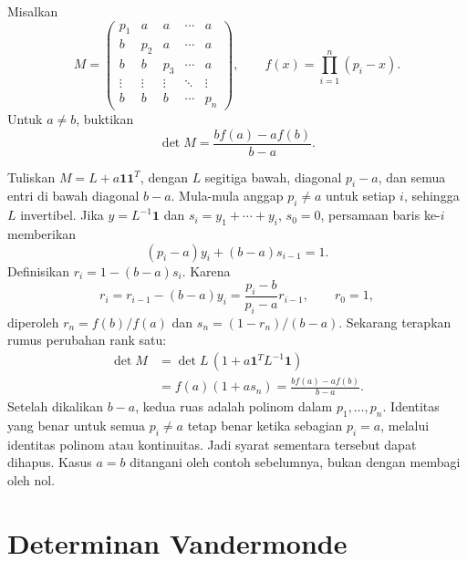 \begin{exam}
      \label{det:zhang26}
      Misalkan
      \[
            M=\begin{pmatrix}
                  p_1    & a      & a      & \cdots & a      \\
                  b      & p_2    & a      & \cdots & a      \\
                  b      & b      & p_3    & \cdots & a      \\
                  \vdots & \vdots & \vdots & \ddots & \vdots \\
                  b      & b      & b      & \cdots & p_n
            \end{pmatrix},\qquad f(x)=\prod_{i=1}^n(p_i-x).
      \]
      Untuk $a\ne b$, buktikan
      \[
            \det M=\frac{bf(a)-af(b)}{b-a}.
      \]
\end{exam}
\begin{solution}
      Tuliskan $M=L+a\boldsymbol{1}\boldsymbol{1}^T$, dengan $L$ segitiga
      bawah, diagonal $p_i-a$, dan semua entri di bawah diagonal $b-a$.
      Mula-mula anggap $p_i\ne a$ untuk setiap $i$, sehingga $L$ invertibel.
      Jika $y=L^{-1}\boldsymbol{1}$ dan $s_i=y_1+\cdots+y_i$, $s_0=0$,
      persamaan baris ke-$i$ memberikan
      \[
            (p_i-a)y_i+(b-a)s_{i-1}=1.
      \]
      Definisikan $r_i=1-(b-a)s_i$. Karena
      \[
            r_i=r_{i-1}-(b-a)y_i
            =\frac{p_i-b}{p_i-a}r_{i-1},\qquad r_0=1,
      \]
      diperoleh $r_n=f(b)/f(a)$ dan $s_n=(1-r_n)/(b-a)$.
      Sekarang terapkan rumus perubahan rank satu:
      \begin{align*}
            \det M
             & =\det L\,(1+a\boldsymbol{1}^TL^{-1}\boldsymbol{1}) \\
             & =f(a)(1+as_n)
            =\frac{bf(a)-af(b)}{b-a}.
      \end{align*}
      Setelah dikalikan $b-a$, kedua ruas adalah polinom dalam
      $p_1,\ldots,p_n$. Identitas yang benar untuk semua $p_i\ne a$
      tetap benar ketika sebagian $p_i=a$, melalui identitas polinom
      atau kontinuitas. Jadi syarat sementara tersebut dapat dihapus.
      Kasus $a=b$ ditangani oleh contoh sebelumnya, bukan dengan membagi oleh nol.
\end{solution}

\section{Determinan Vandermonde}
\label{det:vandermonde}

